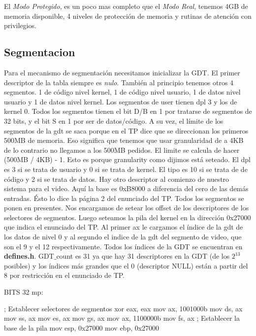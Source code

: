 El \textit{Modo Protegido}, es un poco mas completo que el \textit{Modo Real}, tenemos 4GB de memoria disponible, 4 niveles de protecci\'on de memoria y rutinas de atenci\'on con privilegios.

\subsection{Segmentacion}
Para el mecanismo de segmentación necesitamos inicializar la GDT.
El primer descriptor de la tabla siempre es \textit{nulo}. También al principio tenemos otros 4 segmentos. 1 de código nivel kernel, 1 de código nivel usuario, 1 de datos nivel usuario y 1 de datos nivel kernel. Los segmentos de user tienen dpl 3 y los de kernel 0. Todos los segmentos tienen el bit D/B en 1 por tratarse de segmentos de 32 bits, y el bit S en 1 por ser de datos/código. A su vez, el límite de los segmentos de la gdt se saca porque en el TP dice que se direccionan los primeros 500MB de memoria. Eso significa que tenemos que usar granularidad de a 4KB de lo contrario no llegamos a los 500MB pedidos. El limite se calcula de hacer (500MB / 4KB) - 1. Esto es porque granularity como dijimos está seteado. El dpl es 3 si se trata de usuario y 0 si se trata de kernel. El tipo es 10 si se trata de  de código y 2 si se trata de datos. Hay otro descriptor al comienzo de nuestro sistema para el video. Aquí la base es 0xB8000 a diferencia del cero de las demás entradas. Ésto lo dice la página 2 del enunciado del TP. Todos los segmentos se ponen en presentes.
\newline
Nos encargamos de setear los offset de los descriptores de los selectores de segmentos. Luego seteamos la pila del kernel en la direcci\'on 0x27000 que indica el enunciado del TP. Al primer ax le cargamos el índice de la gdt de los datos de nivel 0 y al segundo el indice de la gdt del segmento de video, que son el 9 y el 12 respectivamente.
\newline
Todos los índices de la GDT se encuentran en \textbf{defines.h}. GDT$\_$count es 31 ya que hay 31 descriptores en la GDT (de los $2^{13}$ posibles) y los índices más grandes que el 0 (descriptor NULL) están a partir del 8 por restricción en el enunciado de TP.

\begin{algorithmic}
\State \tab BITS 32
\State \tab mp:

    \State \tab \tab ; Establecer selectores de segmentos
    \State \tab \tab xor eax, eax
    \State \tab \tab  mov ax, 1001000b
    \State \tab \tab  mov ds, ax
    \State \tab \tab  mov ss, ax
    \State \tab \tab  mov es, ax
    \State \tab \tab  mov gs, ax
    \State \tab \tab  mov ax, 1100000b
    \State \tab \tab  mov fs, ax
    \State \tab \tab  ; Establecer la base de la pila
    \State \tab \tab  mov esp, 0x27000
    \State \tab \tab  mov ebp, 0x27000
\end{algorithmic}

